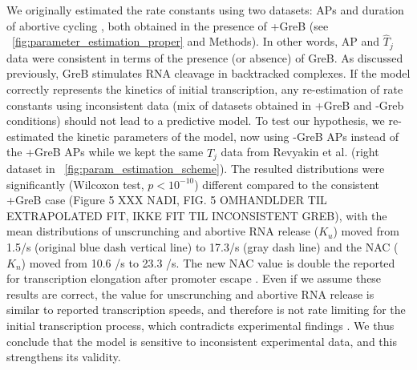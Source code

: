We originally estimated the rate constants using two datasets: APs
\cite{hsu_initial_2006} and duration of abortive cycling
\cite{revyakin_abortive_2006}, both obtained in the presence of +GreB (see
\FIG~\ref{fig:parameter_estimation_proper} and Methods). In other words, AP
and $\hat T_j$ data were consistent in terms of the presence (or absence) of
GreB. As discussed previously, GreB stimulates RNA cleavage in backtracked
complexes. If the model correctly represents the kinetics of initial
transcription, any re-estimation of rate constants using inconsistent data
(mix of datasets obtained in +GreB and -Greb conditions) should not lead to a
predictive model. To test our hypothesis, we re-estimated the
kinetic parameters of the model, now using -GreB APs \cite{hsu_initial_2006}
instead of the +GreB APs while we kept the same $\hat T_j$ data
from Revyakin et al. (right dataset in
\FIG~\ref{fig:param_estimation_scheme}). The resulted distributions were
significantly (Wilcoxon test, $p<10^{-10}$) different compared to the
consistent +GreB case (Figure 5 XXX NADI, FIG. 5 OMHANDLDER TIL EXTRAPOLATED
FIT, IKKE FIT TIL INCONSISTENT GREB), with the mean distributions of
unscrunching and abortive RNA release ($K_u$)
moved from 1.5/s (original blue dash vertical line) to 17.3/s (gray dash line)
and the NAC ($K_n$) moved from 10.6 /s to 23.3 /s. The new NAC value is
double the reported for transcription elongation after promoter escape
\cite{revyakin_abortive_2006}. Even if we assume these results are correct,
the value for unscrunching and abortive RNA release is similar to reported
transcription speeds, and therefore is not rate limiting for the initial
transcription process, which contradicts experimental findings
\cite{revyakin_abortive_2006, margeat_direct_2006}. We thus conclude that the
model is sensitive to inconsistent experimental data, and this strengthens its
validity.
